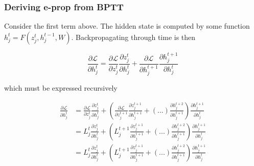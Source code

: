 \documentclass{beamer}
\begin{document}
\begin{frame}[plain]
\frametitle{Deriving e-prop from BPTT} 

Consider the first term above. The hidden state is computed by some function $h_{j}^{t} = F(z_{j}^{t},h_{j}^{t-1} ,W)$. Backpropagating through time is then

\begin{equation*}
\frac{\partial\mathcal{L}}{\partial h^{t}_{j}} = \frac{\partial\mathcal{L}}{\partial z^{t}_{j}} \frac{\partial z^{t}_{j}}{\partial h^{t}_{j}}  + \frac{\partial\mathcal{L}}{\partial h^{t+1}_{j}} \frac{\partial h^{t+1}_{j}}{\partial h^{t}_{j}} 
\end{equation*}

which must be expressed recursively 

\begin{align*}
\frac{\partial\mathcal{L}}{\partial h^{t}_{j}} &= \frac{\partial\mathcal{L}}{\partial z^{t}_{j}} \frac{\partial z^{t}_{j}}{\partial h^{t}_{j}}  +  \left(\frac{\partial\mathcal{L}}{\partial z^{t+1}_{j}} \frac{\partial z^{t+1}_{j}}{\partial h^{t+1}_{j}}  + (...) \frac{\partial h^{t+2}_{j}}{\partial h^{t+1}_{j}} \right) \frac{\partial h^{t+1}_{j}}{\partial h^{t}_{j}} \\
&= L_{j}^{t} \frac{\partial z^{t}_{j}}{\partial h^{t}_{j}}  +  \left(L_{j}^{t+1} \frac{\partial z^{t+1}_{j}}{\partial h^{t+1}_{j}}  + (...) \frac{\partial h^{t+2}_{j}}{\partial h^{t+1}_{j}} \right) \frac{\partial h^{t+1}_{j}}{\partial h^{t}_{j}}\\
&= L_{j}^{t} \frac{\partial z^{t}_{j}}{\partial h^{t}_{j}}  +  \left(L_{j}^{t+1} \frac{\partial z^{t+1}_{j}}{\partial h^{t+1}_{j}}  + (...) \frac{\partial h^{t+2}_{j}}{\partial h^{t+1}_{j}} \right) \frac{\partial h^{t+1}_{j}}{\partial h^{t}_{j}}
\end{align*}

\end{frame}
\end{document}
